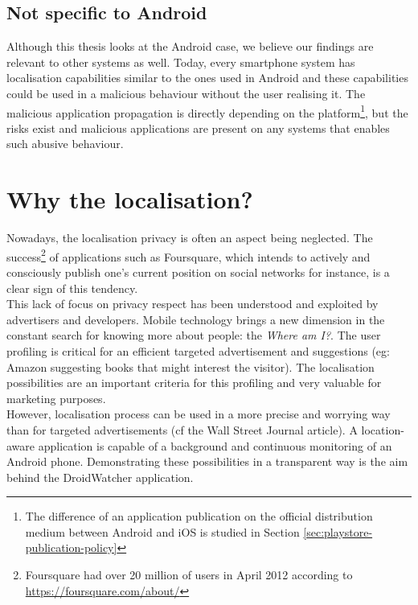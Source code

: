 \subsection*{Not specific to Android}
Although this thesis looks at the Android case, we believe our findings are relevant to other systems as well.
Today, every smartphone system has localisation capabilities similar to the ones used in Android and these capabilities could be used in a malicious behaviour without the user realising it.
The malicious application propagation is directly depending on the platform\footnote{The difference of an application publication on the official distribution medium between Android and iOS is studied in Section \ref{sec:playstore-publication-policy}}, but the risks exist and malicious applications are present on any systems that enables such abusive behaviour.

\section*{Why the localisation?}
\label{sec:why-localisation}

Nowadays, the localisation privacy is often an aspect being neglected.
The success\footnote{Foursquare had over 20 million of users in April 2012 according to \url{https://foursquare.com/about/}} of applications such as Foursquare, which intends to actively and consciously publish one's current position on social networks for instance, is a clear sign of this tendency.\\

This lack of focus on privacy respect has been understood and exploited by advertisers and developers.
Mobile technology brings a new dimension in the constant search for knowing more about people: the \emph{Where am I?}.
The user profiling is critical for an efficient targeted advertisement and suggestions (eg: Amazon suggesting books that might interest the visitor).
The localisation possibilities are an important criteria for this profiling and very valuable for marketing purposes.\\

However, localisation process can be used in a more precise and worrying way than for targeted advertisements (cf the Wall Street Journal article).
A location-aware application is capable of a background and continuous monitoring of an Android phone.
Demonstrating these possibilities in a transparent way is the aim behind the DroidWatcher application.\\

